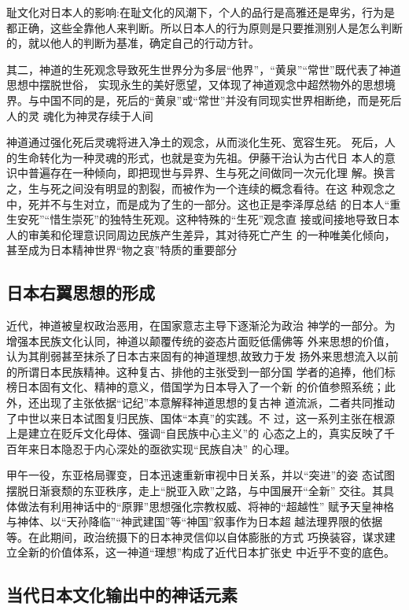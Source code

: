 \documentclass{ctexart}
\begin{document}
耻文化对日本人的影响:在耻文化的风潮下，个人的品行是高雅还是卑劣，行为是都正确，这些全靠他人来判断。所以日本人的行为原则是只要推测别人是怎么判断的，就以他人的判断为基准，确定自己的行动方针。\par
其二，神道的生死观念导致死生世界分为多层“他界”，“黄泉”“常世”既代表了神道思想中摆脱世俗，
实现永生的美好愿望，又体现了神道观念中超然物外的思想境界。与中国不同的是，死后的“黄泉”或“常世”并没有同现实世界相断绝，而是死后人的灵
魂化为神灵存续于人间

神道通过强化死后灵魂将进入净土的观念，从而淡化生死、宽容生死。
死后，人的生命转化为一种灵魂的形式，也就是变为先祖。伊藤干治认为古代日
本人的意识中普遍存在一种倾向，即把现世与异界、生与死之间做同一次元化理
解。换言之，生与死之间没有明显的割裂，而被作为一个连续的概念看待。在这
种观念之中，死并不与生对立，而是成为了生的一部分。这也正是李泽厚总结
的日本人“重生安死”“惜生崇死”的独特生死观。这种特殊的“生死”观念直
接或间接地导致日本人的审美和伦理意识同周边民族产生差异，其对待死亡产生
的一种唯美化倾向，甚至成为日本精神世界“物之哀”特质的重要部分

\subsection{日本右翼思想的形成}

近代，神道被皇权政治恶用，在国家意志主导下逐渐沦为政治
神学的一部分。为增强本民族文化认同，神道以颠覆传统的姿态片面贬低儒佛等
外来思想的价值，认为其削弱甚至抹杀了日本古来固有的神道理想,故致力于发
扬外来思想流入以前的所谓日本民族精神。这种复古、排他的主张受到一部分国
学者的追捧，他们标榜日本固有文化、精神的意义，借国学为日本导入了一个新
的价值参照系统；此外，还出现了主张依据“记纪”本意解释神道思想的复古神
道流派，二者共同推动了中世以来日本试图复归民族、国体“本真”的实践。不
过，这一系列主张在根源上是建立在贬斥文化母体、强调“自民族中心主义”的
心态之上的，真实反映了千百年来日本隐忍于内心深处的亟欲实现“民族自决”
的心理。\par
甲午一役，东亚格局骤变，日本迅速重新审视中日关系，并以“突进”的姿
态试图摆脱日渐衰颓的东亚秩序，走上“脱亚入欧”之路，与中国展开“全新”
交往。其具体做法有利用神话中的“原罪”思想强化宗教权威、将神的“超越性”
赋予天皇神格与神体、以“天孙降临”“神武建国”等“神国”叙事作为日本超
越法理界限的依据等。在此期间，政治统摄下的日本神灵信仰以自体膨胀的方式
巧换装容，谋求建立全新的价值体系，这一神道“理想”构成了近代日本扩张史
中近乎不变的底色。

\subsection{当代日本文化输出中的神话元素}
\end{document}
